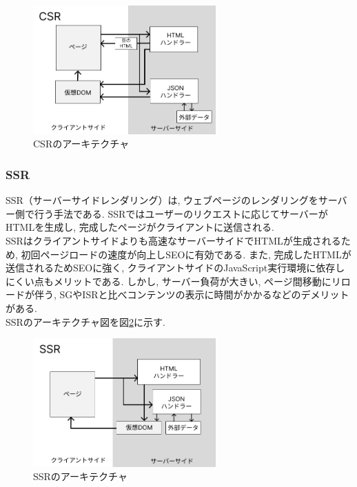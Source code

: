 \begin{figure}[htbp]
	\begin{center}
		\includegraphics[width=70mm]{./images/CSR.png}
		\caption{CSRのアーキテクチャ}\label{fig:CSR-image}
	\end{center}
\end{figure}

\newpage
\subsubsection{SSR}
SSR（サーバーサイドレンダリング）は, ウェブページのレンダリングをサーバー側で行う手法である. 
SSRではユーザーのリクエストに応じてサーバーがHTMLを生成し, 完成したページがクライアントに送信される. \\
SSRはクライアントサイドよりも高速なサーバーサイドでHTMLが生成されるため, 初回ページロードの速度が向上しSEOに有効である. 
また, 完成したHTMLが送信されるためSEOに強く, クライアントサイドのJavaScript実行環境に依存しにくい点もメリットである. 
しかし, サーバー負荷が大きい, ページ間移動にリロードが伴う, SGやISRと比べコンテンツの表示に時間がかかるなどのデメリットがある. \\
SSRのアーキテクチャ図を図\ref{fig:SSR-image}に示す. 

\begin{figure}[htbp]
	\begin{center}
		\includegraphics[width=70mm]{./images/SSR.png}
		\caption{SSRのアーキテクチャ}\label{fig:SSR-image}
	\end{center}
\end{figure}

